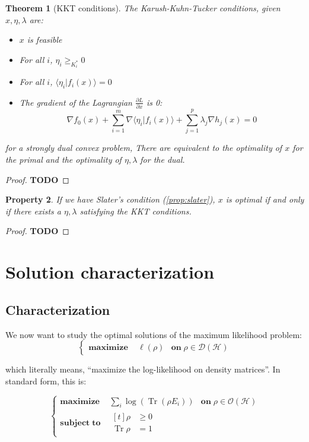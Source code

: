 \documentclass[10pt]{report}
\theoremstyle{plain}
\newtheorem{thm}{Theorem}[chapter]
\newtheorem{prop}[thm]{Property}
\theoremstyle{definition}
\theoremstyle{remark}
\newcommand{\TODO}{\textbf{TODO}}
\newcommand{\braket}[2]{\langle#1|#2\rangle}
\newcommand{\dpar}[2]{\frac{\partial{#1}}{\partial{#2}}}
\renewcommand{\geq}{\geqslant}
\DeclareMathOperator{\Tr}{Tr}
\newcommand{\maximf}[2]{\begin{cases}
    \mathbf{maximize}\,\quad #1& \mathbf{on}\; #2
  \end{cases}}
\newcommand{\maxima}[3]{\begin{cases}
    \mathbf{maximize}\,\quad #1& \mathbf{on}\; #2\\
    \mathbf{subject\;to}\quad \begin{aligned}[t]#3\end{aligned}
  \end{cases}}
\begin{document}
\begin{thm}[KKT conditions]\label{thm:KKT}
  The Karush-Kuhn-Tucker conditions, given $x,\eta,\lambda$ are:
  \begin{itemize}
  \item $x$ is feasible
  \item For all $i$, $\eta_i \geq_{K_i^*}0$
  \item For all $i$, $\braket {\eta_i}{f_i({x})} = 0$
  \item The gradient of the Lagrangian $\dpar L x$ is 0:
    \[ \nabla f_0(x) + \sum_{i = 1}^m \nabla\braket{\eta_i}{f_i(x)} +
      \sum_{j=1}^p \lambda_j \nabla h_j(x) = 0\]
  \end{itemize}
  for a strongly dual convex problem, There are equivalent to the optimality of
  $x$ for the primal and the optimality of $\eta,\lambda$ for the dual.

\end{thm}

\begin{proof}
\TODO{}
\end{proof}

\begin{prop}\label{prop:slaterKKT}
  If we have Slater's condition (\ref{prop:slater}), $x$ is optimal if and only if there exists a
  $\eta,\lambda$ satisfying the KKT conditions.
\end{prop}

\begin{proof}
\TODO{}
\end{proof}

\section{Solution characterization}

\subsection{Characterization}

We now want to study the optimal solutions of the maximum likelihood problem:
\[\maximf{\ell(\rho)}{\rho \in \mathcal{D}(\mathcal{H})} \]

which literally means, ``maximize the log-likelihood on density matrices''. In
standard form, this is:

\[\maxima{\displaystyle\sum_i \log(\Tr(\rho E_i))}{\rho \in \mathcal{O}(\mathcal{H})}
  {\rho &\geq 0\\\Tr \rho &= 1}
\]
\end{document}
